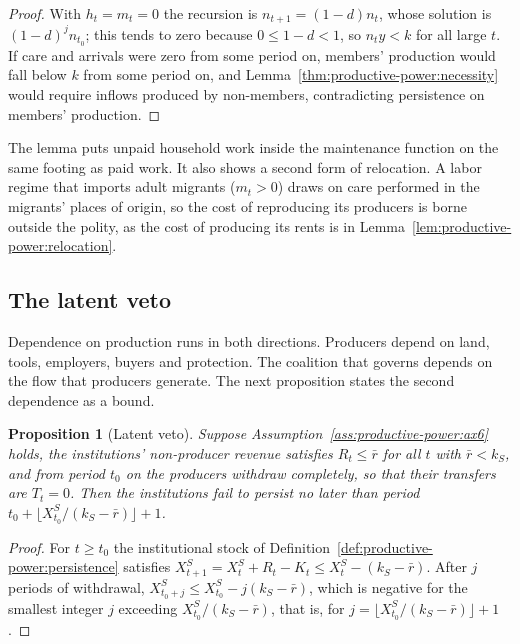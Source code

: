 \documentclass[11pt,letterpaper]{article}
\newtheorem{proposition}[theorem]{Proposition}
\theoremstyle{definition}
\theoremstyle{remark}
\begin{document}
\begin{proof}
With $h_t=m_t=0$ the recursion is $n_{t+1}=(1-d)n_t$, whose solution is $(1-d)^jn_{t_0}$; this tends to zero because $0\le 1-d<1$, so $n_ty<k$ for all large $t$. If care and arrivals were zero from some period on, members' production would fall below $k$ from some period on, and Lemma~\ref{thm:productive-power:necessity} would require inflows produced by non-members, contradicting persistence on members' production.
\end{proof}

The lemma puts unpaid household work inside the maintenance function on the same footing as paid work. It also shows a second form of relocation. A labor regime that imports adult migrants ($m_t>0$) draws on care performed in the migrants' places of origin, so the cost of reproducing its producers is borne outside the polity, as the cost of producing its rents is in Lemma~\ref{lem:productive-power:relocation}.

\subsection{The latent veto}

Dependence on production runs in both directions. Producers depend on land, tools, employers, buyers and protection. The coalition that governs depends on the flow that producers generate. The next proposition states the second dependence as a bound.

\begin{proposition}[Latent veto]
\label{prop:productive-power:latent-veto}
Suppose Assumption~\ref{ass:productive-power:ax6} holds, the institutions' non-producer revenue satisfies $R_t\le\bar r$ for all $t$ with $\bar r<k_S$, and from period $t_0$ on the producers withdraw completely, so that their transfers are $T_t=0$. Then the institutions fail to persist no later than period $t_0+\lfloor X^S_{t_0}/(k_S-\bar r)\rfloor+1$.
\end{proposition}

\begin{proof}
For $t\ge t_0$ the institutional stock of Definition~\ref{def:productive-power:persistence} satisfies $X^S_{t+1}=X^S_t+R_t-K_t\le X^S_t-(k_S-\bar r)$. After $j$ periods of withdrawal, $X^S_{t_0+j}\le X^S_{t_0}-j(k_S-\bar r)$, which is negative for the smallest integer $j$ exceeding $X^S_{t_0}/(k_S-\bar r)$, that is, for $j=\lfloor X^S_{t_0}/(k_S-\bar r)\rfloor+1$.
\end{proof}
\end{document}
